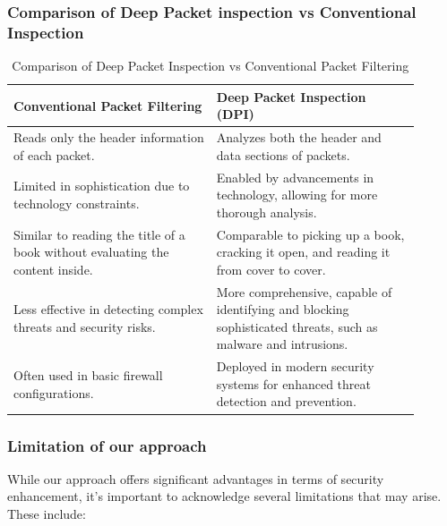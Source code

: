 \documentclass[12pt,letterpaper]{article}
\begin{document}
        \subsubsection{Comparison of Deep Packet inspection vs Conventional Inspection}

        \begin{table}[ht]
    \centering
    \caption{Comparison of Deep Packet Inspection vs Conventional Packet Filtering}
    \label{table:comparison}
    \begin{tabular}{p{0.45\linewidth} p{0.45\linewidth}}
        \toprule
        \textbf{Conventional Packet Filtering} & \textbf{Deep Packet Inspection (DPI)} \\
        \midrule
        Reads only the header information of each packet. & Analyzes both the header and data sections of packets. \\
        Limited in sophistication due to technology constraints. & Enabled by advancements in technology, allowing for more thorough analysis. \\
        Similar to reading the title of a book without evaluating the content inside. & Comparable to picking up a book, cracking it open, and reading it from cover to cover. \\
        Less effective in detecting complex threats and security risks. & More comprehensive, capable of identifying and blocking sophisticated threats, such as malware and intrusions. \\
        Often used in basic firewall configurations. & Deployed in modern security systems for enhanced threat detection and prevention. \\
        \bottomrule
    \end{tabular}
\end{table}


        \subsubsection{Limitation of our approach}

            While our approach offers significant advantages in terms of security enhancement, it's important to acknowledge several limitations that may arise. These include:
\end{document}
